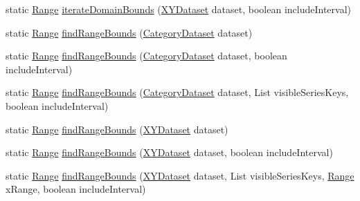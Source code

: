 \begin{DoxyCompactItemize}
\item 
static \mbox{\hyperlink{classorg_1_1jfree_1_1data_1_1_range}{Range}} \mbox{\hyperlink{classorg_1_1jfree_1_1data_1_1general_1_1_dataset_utilities_a23c2f4864b1d18e6faf3ae486cc443b5}{iterate\+Domain\+Bounds}} (\mbox{\hyperlink{interfaceorg_1_1jfree_1_1data_1_1xy_1_1_x_y_dataset}{X\+Y\+Dataset}} dataset, boolean include\+Interval)
\item 
static \mbox{\hyperlink{classorg_1_1jfree_1_1data_1_1_range}{Range}} \mbox{\hyperlink{classorg_1_1jfree_1_1data_1_1general_1_1_dataset_utilities_a688e428b19801191aec39518a19265ae}{find\+Range\+Bounds}} (\mbox{\hyperlink{interfaceorg_1_1jfree_1_1data_1_1category_1_1_category_dataset}{Category\+Dataset}} dataset)
\item 
static \mbox{\hyperlink{classorg_1_1jfree_1_1data_1_1_range}{Range}} \mbox{\hyperlink{classorg_1_1jfree_1_1data_1_1general_1_1_dataset_utilities_af24d00815f3c6487bd80df8b148acfeb}{find\+Range\+Bounds}} (\mbox{\hyperlink{interfaceorg_1_1jfree_1_1data_1_1category_1_1_category_dataset}{Category\+Dataset}} dataset, boolean include\+Interval)
\item 
static \mbox{\hyperlink{classorg_1_1jfree_1_1data_1_1_range}{Range}} \mbox{\hyperlink{classorg_1_1jfree_1_1data_1_1general_1_1_dataset_utilities_a593802b49fe6d916e951136610d0a8c1}{find\+Range\+Bounds}} (\mbox{\hyperlink{interfaceorg_1_1jfree_1_1data_1_1category_1_1_category_dataset}{Category\+Dataset}} dataset, List visible\+Series\+Keys, boolean include\+Interval)
\item 
static \mbox{\hyperlink{classorg_1_1jfree_1_1data_1_1_range}{Range}} \mbox{\hyperlink{classorg_1_1jfree_1_1data_1_1general_1_1_dataset_utilities_ab0b65af161cd8234170cf7a5019fd336}{find\+Range\+Bounds}} (\mbox{\hyperlink{interfaceorg_1_1jfree_1_1data_1_1xy_1_1_x_y_dataset}{X\+Y\+Dataset}} dataset)
\item 
static \mbox{\hyperlink{classorg_1_1jfree_1_1data_1_1_range}{Range}} \mbox{\hyperlink{classorg_1_1jfree_1_1data_1_1general_1_1_dataset_utilities_ab8786c80dc8295cf2e52b972eb2b2cda}{find\+Range\+Bounds}} (\mbox{\hyperlink{interfaceorg_1_1jfree_1_1data_1_1xy_1_1_x_y_dataset}{X\+Y\+Dataset}} dataset, boolean include\+Interval)
\item 
static \mbox{\hyperlink{classorg_1_1jfree_1_1data_1_1_range}{Range}} \mbox{\hyperlink{classorg_1_1jfree_1_1data_1_1general_1_1_dataset_utilities_ac396df6e5ab7f6a3bc86dc6d81617030}{find\+Range\+Bounds}} (\mbox{\hyperlink{interfaceorg_1_1jfree_1_1data_1_1xy_1_1_x_y_dataset}{X\+Y\+Dataset}} dataset, List visible\+Series\+Keys, \mbox{\hyperlink{classorg_1_1jfree_1_1data_1_1_range}{Range}} x\+Range, boolean include\+Interval)

\end{DoxyCompactItemize}

